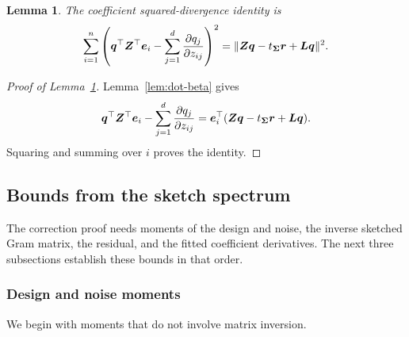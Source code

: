 \documentclass{article}
\theoremstyle{plain}
\newtheorem{lemma}[theorem]{Lemma}
\theoremstyle{definition}
\theoremstyle{definition}
\DeclarePairedDelimiter\norm{\lVert}{\rVert}
\def\mathbold{\boldsymbol}
\def\bL{\mathbold{L}}\def\hbL{{\widehat{\bL}}}\def\tbL{{\widetilde{\bL}}}
\def\bq{\mathbold{q}}\def\qhat{\widehat{q}}\def\qtil{\widetilde{q}}\def\qbar{{\overline q}}
\def\br{\mathbold{r}}\def\rhat{\widehat{r}}\def\rtil{\widetilde{r}}\def\rbar{{\overline r}}
\def\be{\mathbold{e}}
\def\bZ{\mathbold{Z}}\def\hbZ{{\widehat{\bZ}}}\def\tbZ{{\widetilde{\bZ}}}
\def\bSigma{\mathbold{\Sigma}}\def\hbSigma{{\widehat{\bSigma}}}
\begin{document}
\begin{lemma}\label{lem:dot-hxxh}
The coefficient squared-divergence identity is
\begin{align*}
    \sum_{i=1}^n\left(
       \bq^\top\bZ^\top\be_i-\sum_{j=1}^d\pdv{q_j}{z_{ij}}
    \right)^2
    =\norm{\bZ\bq-t_{\bSigma}\br+\bL\bq}^2.
\end{align*}
\end{lemma}

\begin{proof}[Proof of Lemma~\ref{lem:dot-hxxh}]
Lemma~\ref{lem:dot-beta} gives
\begin{align*}
    \bq^\top\bZ^\top\be_i-\sum_{j=1}^d\pdv{q_j}{z_{ij}}
    =\be_i^\top(\bZ\bq-t_{\bSigma}\br+\bL\bq).
\end{align*}
Squaring and summing over $i$ proves the identity.
\end{proof}

\subsection{Bounds from the sketch spectrum}
\label{app:auxiliary-lemmas-and-proofs}

The correction proof needs moments of the design and noise, the inverse
sketched Gram matrix, the residual, and the fitted coefficient derivatives.
The next three subsections establish these bounds in that order.

\subsubsection{Design and noise moments}

We begin with moments that do not involve matrix inversion.
\end{document}
